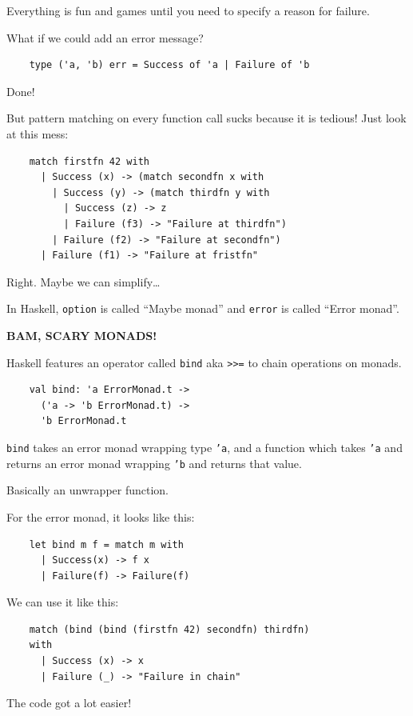 \documentclass{beamer}
\renewcommand{\example}[1]{{\usebeamercolor[fg]{example text} #1}}
\begin{document}
\begin{frame}[fragile]
  Everything is fun and games until you need to specify a \alert{reason} for
  failure.

  What if we could add an error message?
  \begin{verbatim}
    type ('a, 'b) err = Success of 'a | Failure of 'b
  \end{verbatim}
  Done!
\end{frame}

\begin{frame}[fragile]
  But pattern matching on every function call sucks because it is
  \alert{tedious}! Just look at this mess:
  \begin{verbatim}
    match firstfn 42 with
      | Success (x) -> (match secondfn x with
        | Success (y) -> (match thirdfn y with
          | Success (z) -> z
          | Failure (f3) -> "Failure at thirdfn")
        | Failure (f2) -> "Failure at secondfn")
      | Failure (f1) -> "Failure at fristfn"
  \end{verbatim}

  Right. Maybe we can \example{simplify}…

  In Haskell, \texttt{option} is called \enquote{Maybe monad} and
  \texttt{error} is called \enquote{Error monad}.

  \pause
  \begin{center}
    {\Large \alert{\textbf{BAM, SCARY MONADS!}}}
  \end{center}
\end{frame}

\begin{frame}[fragile]
  Haskell features an operator called \texttt{bind} aka \texttt{>>=} to
  chain operations on monads.

  \begin{verbatim}
    val bind: 'a ErrorMonad.t ->
      ('a -> 'b ErrorMonad.t) ->
      'b ErrorMonad.t
  \end{verbatim}

  \texttt{bind} takes an error monad wrapping type \texttt{'a}, and a function
  which takes \texttt{'a} and returns an error monad wrapping
  \texttt{'b} and returns that value.

  Basically an unwrapper function.
\end{frame}

\begin{frame}[fragile]
  For the error monad, it looks like this:
  \begin{verbatim}
    let bind m f = match m with
      | Success(x) -> f x
      | Failure(f) -> Failure(f)
  \end{verbatim}

  We can use it like this:

  \begin{verbatim}
    match (bind (bind (firstfn 42) secondfn) thirdfn)
    with
      | Success (x) -> x
      | Failure (_) -> "Failure in chain"
  \end{verbatim}
  The code got a lot \example{easier}!
\end{frame}
\end{document}
